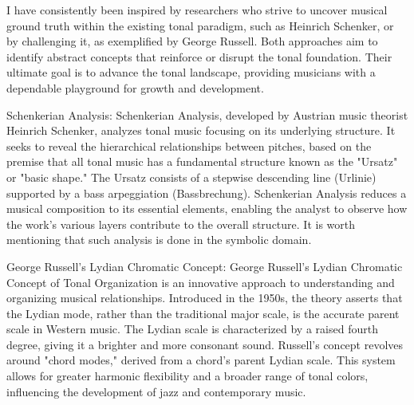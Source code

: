 I have consistently been inspired by researchers who strive to uncover musical ground truth within the existing tonal paradigm, such as Heinrich Schenker\cite{}, or by challenging it, as exemplified by George Russell\cite{LydianRussell}. Both approaches aim to identify abstract concepts that reinforce or disrupt the tonal foundation. Their ultimate goal is to advance the tonal landscape, providing musicians with a dependable playground for growth and development.

Schenkerian Analysis:
Schenkerian Analysis, developed by Austrian music theorist Heinrich Schenker, analyzes tonal music focusing on its underlying structure. It seeks to reveal the hierarchical relationships between pitches, based on the premise that all tonal music has a fundamental structure known as the "Ursatz" or "basic shape." The Ursatz consists of a stepwise descending line (Urlinie) supported by a bass arpeggiation (Bassbrechung). Schenkerian Analysis reduces a musical composition to its essential elements, enabling the analyst to observe how the work's various layers contribute to the overall structure. It is worth mentioning that such analysis is done in the symbolic domain.

George Russell's Lydian Chromatic Concept:
George Russell's Lydian Chromatic Concept of Tonal Organization is an innovative approach to understanding and organizing musical relationships. Introduced in the 1950s, the theory asserts that the Lydian mode, rather than the traditional major scale, is the accurate parent scale in Western music. The Lydian scale is characterized by a raised fourth degree, giving it a brighter and more consonant sound. Russell's concept revolves around "chord modes," derived from a chord's parent Lydian scale. This system allows for greater harmonic flexibility and a broader range of tonal colors, influencing the development of jazz and contemporary music.